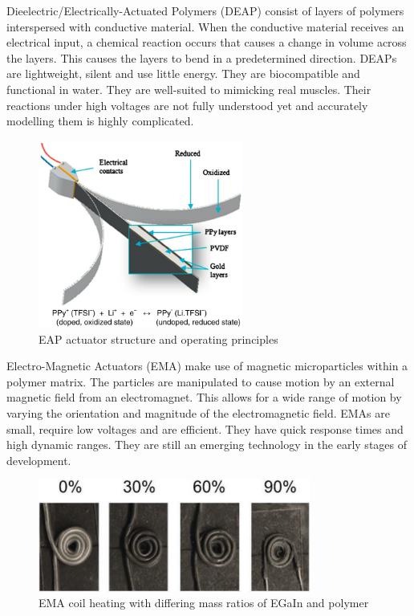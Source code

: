 Dieelectric/Electrically-Actuated Polymers (DEAP) consist of layers of polymers interspersed with conductive material. When the conductive material receives an electrical input, a chemical reaction occurs that causes a change in volume across the layers. This causes the layers to bend in a predetermined direction. DEAPs are lightweight, silent and use little energy. They are biocompatible and functional in water. They are well-suited to mimicking real muscles. Their reactions under high voltages are not fully understood yet and accurately modelling them is highly complicated. \cite{Mutlu2014}

\begin{figure}[H]
	\centering
	\includegraphics[width=0.6\textwidth]{EAP.png}
	\caption{EAP actuator structure and operating principles \cite{Mutlu2014}}
	\label{fig:eap}
\end{figure}

Electro-Magnetic Actuators (EMA) make use of magnetic microparticles within a polymer matrix. The particles are manipulated to cause motion by an external magnetic field from an electromagnet. This allows for a wide range of motion by varying the orientation and magnitude of the electromagnetic field. EMAs are small, require low voltages and are efficient. They have quick response times and high dynamic ranges. They are still an emerging technology in the early stages of development. \cite{Do2018}

\begin{figure}[H]
	\centering
	\includegraphics[width=0.8\textwidth]{EMA.png}
	\caption{EMA coil heating with differing mass ratios of EGaIn and polymer \cite{Do2018}}
	\label{fig:ema}
\end{figure}

